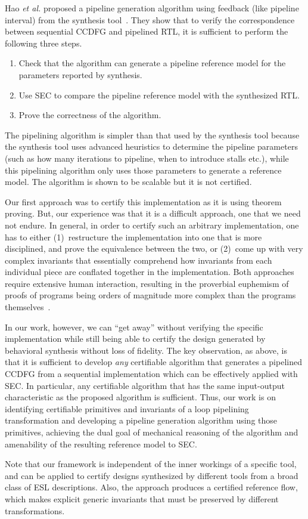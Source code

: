 Hao {\em et al.} proposed a pipeline generation algorithm using feedback (like pipeline interval) from the synthesis tool~\cite{hrx:dac-12}. 
They show that to verify the correspondence between sequential CCDFG and pipelined RTL, it is sufficient to perform the following three steps. 
\begin{enumerate} 
\item Check that the algorithm can generate a pipeline reference model for the parameters reported by synthesis.
\item Use SEC to compare the pipeline reference model with the synthesized RTL.
\item Prove the correctness of the algorithm. 
\end{enumerate}
The pipelining algorithm is simpler than that used by the synthesis tool because the synthesis tool uses advanced heuristics to determine the pipeline parameters (such as how many iterations to pipeline, when to introduce stalls etc.), while this pipelining algorithm only uses those parameters to generate a reference model. The algorithm is shown to be scalable but it is not certified. 

Our first approach was to certify this implementation as it is using theorem proving. 
But, our experience was that it is a difficult approach, one that we need not endure. 
In general, in order to certify such an arbitrary implementation,
one has to either (1)~restructure the implementation into
one that is more disciplined, and prove the equivalence
between the two, or (2)~come up with very complex
invariants that essentially comprehend how invariants from
each individual piece are conflated together in the
implementation.  Both approaches require extensive human
interaction, resulting in the proverbial euphemism of proofs
of programs being orders of magnitude more complex than the
programs themselves~\cite{liu}.

In our work, however, we can ``get away'' without verifying
the specific implementation while still being able to
certify the design generated by behavioral synthesis without
loss of fidelity. The key observation, as above, is that it
is sufficient to develop {\em any} certifiable algorithm
that generates a pipelined CCDFG from a sequential
implementation which can be effectively applied with SEC.
In particular, any certifiable algorithm that has the same
input-output characteristic as the proposed algorithm
is sufficient.  Thus, our work is on identifying
certifiable primitives and invariants of a loop pipelining
transformation and developing a pipeline generation
algorithm using those primitives, achieving the dual goal of
mechanical reasoning of the algorithm and amenability of the
resulting reference model to SEC.

Note that our framework is independent of the inner workings of a specific tool, 
and can be applied to certify designs synthesized by different tools from a broad 
class of ESL descriptions. Also, the approach produces a certified reference flow, 
which makes explicit generic invariants that must be preserved by different transformations. 








